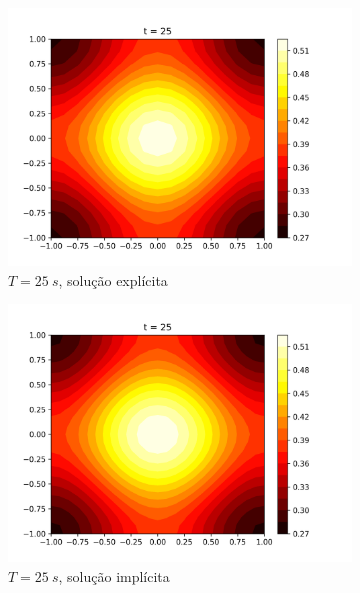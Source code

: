 \documentclass{article}
\begin{document}
\begin{figure}[h]
     \begin{subfigure}[b]{0.49\textwidth}
         \centering
         \includegraphics[width=\textwidth]{figs/q7a_heatmap_t25.png}
         \caption{$T=25~s$, solução explícita}
	\label{fig:q7a_heatmap_t25}
     \end{subfigure}
     \hfill
     \begin{subfigure}[b]{0.49\textwidth}
         \centering
     \includegraphics[width=\textwidth]{figs/q7b_heatmap_t25.png}
         \caption{$T=25~s$, solução implícita}
	\label{fig:q7b_heatmap_t25}
     \end{subfigure}
     \vfill
     \begin{subfigure}[b]{0.49\textwidth}

\end{subfigure}
\end{figure}
\end{document}
